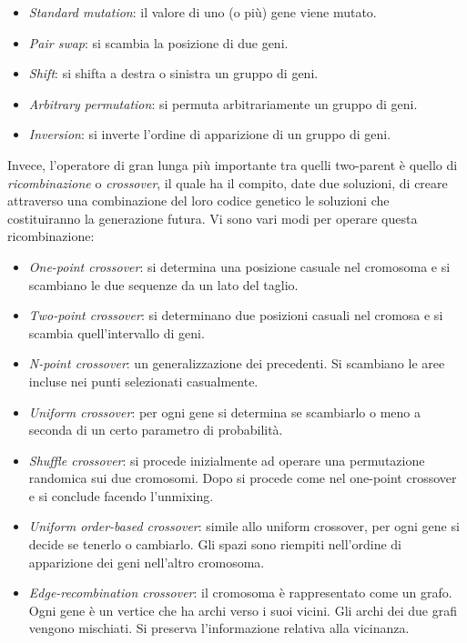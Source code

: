 \documentclass[10pt,a4paper]{article}
\begin{document}
\begin{itemize}
\item{\emph{Standard mutation}: il valore di uno (o più) gene viene mutato.}
\item{\emph{Pair swap}: si scambia la posizione di due geni.}
\item{\emph{Shift}: si shifta a destra o sinistra un gruppo di geni.}
\item{\emph{Arbitrary permutation}: si permuta arbitrariamente un gruppo di geni.}
\item{\emph{Inversion}: si inverte l'ordine di apparizione di un gruppo di geni.}
\end{itemize}

Invece, l'operatore di gran lunga più importante tra quelli two-parent è quello di \emph{ricombinazione} o \emph{crossover}, il quale ha il compito, date due soluzioni, di creare attraverso una combinazione del loro codice genetico le soluzioni che costituiranno la generazione futura. Vi sono vari modi per operare questa ricombinazione:

\begin{itemize}
\item{\emph{One-point crossover}: si determina una posizione casuale nel cromosoma e si scambiano le due sequenze da un lato del taglio.}
\item{\emph{Two-point crossover}: si determinano due posizioni casuali nel cromosa e si scambia quell'intervallo di geni.}
\item{\emph{N-point crossover}: un generalizzazione dei precedenti. Si scambiano le aree incluse nei punti selezionati casualmente.}
\item{\emph{Uniform crossover}: per ogni gene si determina se scambiarlo o meno a seconda di un certo parametro di probabilità.}
\item{\emph{Shuffle crossover}: si procede inizialmente ad operare una permutazione randomica sui due cromosomi. Dopo si procede come nel one-point crossover e si conclude facendo l'unmixing.}
\item{\emph{Uniform order-based crossover}: simile allo uniform crossover, per ogni gene si decide se tenerlo o cambiarlo. Gli spazi sono riempiti nell'ordine di apparizione dei geni nell'altro cromosoma.}
\item{\emph{Edge-recombination crossover}: il cromosoma è rappresentato come un grafo. Ogni gene è un vertice che ha archi verso i suoi vicini. Gli archi dei due grafi vengono mischiati. Si preserva l'informazione relativa alla vicinanza.}
\end{itemize}
\end{document}
